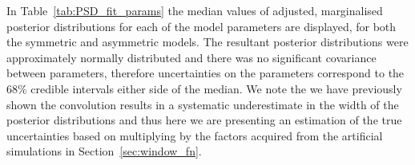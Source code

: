 In Table~\ref{tab:PSD_fit_params} the median values of adjusted, marginalised posterior distributions for each of the model parameters are displayed, for both the symmetric and asymmetric models. The resultant posterior distributions were approximately normally distributed and there was no significant covariance between parameters, therefore uncertainties on the parameters correspond to the $68 \%$ credible intervals either side of the median. We note the we have previously shown the convolution results in a systematic underestimate in the width of the posterior distributions and thus here we are presenting an estimation of the true uncertainties based on multiplying by the factors acquired from the artificial simulations in Section~\ref{sec:window_fn}.



